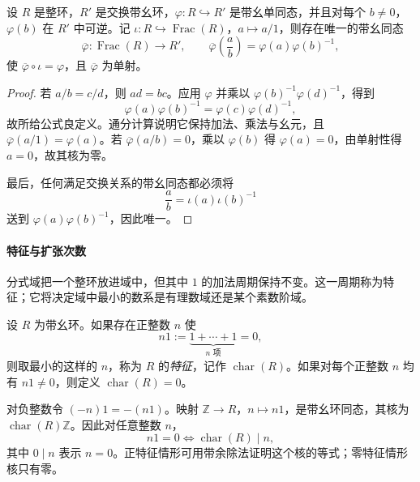 \documentclass[lang=cn,a4paper,fontset=none,zihao=false,10pt,openany,twoside]{beautybook}
\numberwithin{algorithm}{chapter}
\begin{document}
\begin{proposition}[分式域的泛性质]
设 $R$ 是整环，$R'$ 是交换带幺环，$\varphi:R\hookrightarrow R'$ 是带幺单同态，并且对每个 $b\ne0$，$\varphi(b)$ 在 $R'$ 中可逆。记 $\iota:R\hookrightarrow\operatorname{Frac}(R)$，$a\mapsto a/1$，则存在唯一的带幺同态
\[
 \overline\varphi:\operatorname{Frac}(R)\longrightarrow R',\qquad
 \overline\varphi\left(\frac ab\right)=\varphi(a)\varphi(b)^{-1},
\]
使 $\overline\varphi\circ\iota=\varphi$，且 $\overline\varphi$ 为单射。
\begin{center}
\end{center}
\end{proposition}
\begin{proof}
若 $a/b=c/d$，则 $ad=bc$。应用 $\varphi$ 并乘以 $\varphi(b)^{-1}\varphi(d)^{-1}$，得到
\[
 \varphi(a)\varphi(b)^{-1}=\varphi(c)\varphi(d)^{-1},
\]
故所给公式良定义。通分计算说明它保持加法、乘法与幺元，且 $\overline\varphi(a/1)=\varphi(a)$。若 $\overline\varphi(a/b)=0$，乘以 $\varphi(b)$ 得 $\varphi(a)=0$，由单射性得 $a=0$，故其核为零。

最后，任何满足交换关系的带幺同态都必须将
\[
 \frac ab=\iota(a)\iota(b)^{-1}
\]
送到 $\varphi(a)\varphi(b)^{-1}$，因此唯一。
\end{proof}

\paragraph{特征与扩张次数}
分式域把一个整环放进域中，但其中 $1$ 的加法周期保持不变。这一周期称为特征；它将决定域中最小的数系是有理数域还是某个素数阶域。
\begin{definition}[环的特征]
设 $R$ 为带幺环。如果存在正整数 $n$ 使
\[
 n1:=\underbrace{1+\cdots+1}_{n\text{ 项}}=0,
\]
则取最小的这样的 $n$，称为 $R$ 的\emph{特征}，记作 $\operatorname{char}(R)$。如果对每个正整数 $n$ 均有 $n1\ne0$，则定义 $\operatorname{char}(R)=0$。
\end{definition}
对负整数令 $(-n)1=-(n1)$。映射 $\mathbb Z\to R$，$n\mapsto n1$，是带幺环同态，其核为 $\operatorname{char}(R)\mathbb Z$。因此对任意整数 $n$，
\[
 n1=0\Longleftrightarrow\operatorname{char}(R)\mid n,
\]
其中 $0\mid n$ 表示 $n=0$。正特征情形可用带余除法证明这个核的等式；零特征情形核只有零。
\end{document}
